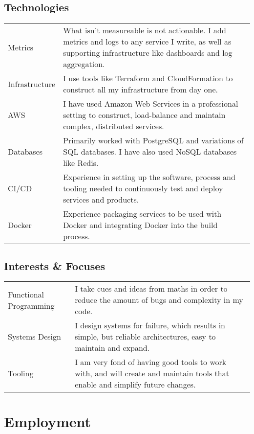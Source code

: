 \documentclass[a4paper]{article}
\begin{document}
\subsection*{Technologies}
\begin{tabular}{ p{3cm} || p{13cm} }
Metrics & What isn't measureable is not actionable. I add metrics and logs to
any service I write, as well as supporting infrastructure like dashboards and
log aggregation. \\
Infrastructure & I use tools like Terraform and CloudFormation to
construct all my infrastructure from day one. \\
AWS & I have used Amazon Web Services in a professional setting to construct, load-balance and
maintain complex, distributed services. \\
Databases & Primarily worked with PostgreSQL and variations of SQL
databases. I have also used NoSQL databases like Redis. \\
CI/CD & Experience in setting up the software, process and tooling needed
to continuously test and deploy services and products.\\
Docker & Experience packaging services to be used with Docker and
integrating Docker into the build process.
\end{tabular}

\subsection*{Interests \& Focuses}
\begin{tabular}{ p{3cm} || p{13cm} }
Functional \linebreak Programming & I take cues and ideas from maths in order to reduce the
amount of bugs and complexity in my code.\\
Systems Design & I design systems for failure, which results in simple,
but reliable architectures, easy to maintain and expand.\\
Tooling & I am very fond of having good tools to work with, and will create and
maintain tools that enable and simplify future changes. \\
\end{tabular}

\section*{Employment}
\end{document}
